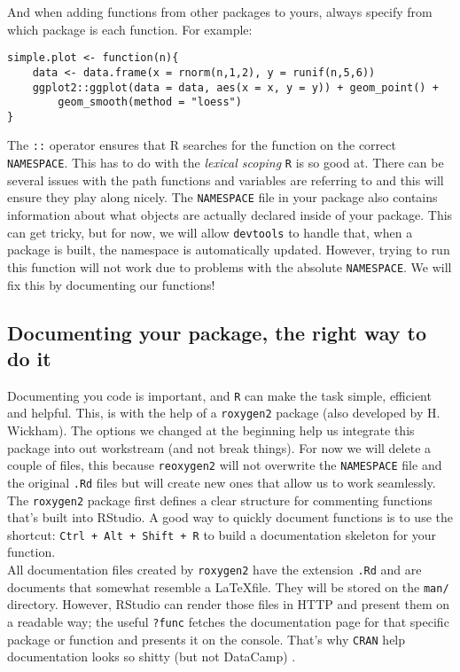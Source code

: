 \documentclass[pdftex,11pt,a4paper]{article}
\newcommand{\R}{\texttt{R} }
\begin{document}
And when adding functions from other packages to yours, always specify from which package is each function. For example:

\begin{verbatim}
simple.plot <- function(n){
	data <- data.frame(x = rnorm(n,1,2), y = runif(n,5,6))
	ggplot2::ggplot(data = data, aes(x = x, y = y)) + geom_point() +
		geom_smooth(method = "loess")
}
\end{verbatim}

The \verb|::| operator ensures that R searches for the function on the correct \verb|NAMESPACE|. This has to do with the \textit{lexical scoping} \R is so good at. There can be several issues with the path functions and variables are referring to and this will ensure they play along nicely. The \verb|NAMESPACE| file in your package also contains information about what objects are actually declared inside of your package. This can get tricky, but for now, we will allow \verb|devtools| to handle that, when a package is built, the namespace is automatically updated. However, trying to run this function will not work due to problems with the absolute \verb|NAMESPACE|. We will fix this by documenting our functions!

\subsection*{Documenting your package, the right way to do it}
Documenting you code is important, and \R can make the task simple, efficient and helpful. This, is with the help of a \verb|roxygen2| package (also developed by H. Wickham). The options we changed at the beginning help us integrate this package into out workstream (and not break things). For now we will delete a couple of files, this because \verb|reoxygen2| will not overwrite the \verb|NAMESPACE| file and the original \verb|.Rd| files but will create new ones that allow us to work seamlessly. The \verb|roxygen2| package first defines a clear structure for commenting functions that's built into RStudio. A good way to quickly document functions is to use the shortcut: \verb|Ctrl + Alt + Shift + R| to build a documentation skeleton for your function. \\

All documentation files created by \verb|roxygen2| have the extension \verb|.Rd| and are documents that somewhat resemble a \LaTeX file. They will be stored on the \verb|man/| directory. However, RStudio can render those files in HTTP and present them on a readable way; the useful \verb|?func| fetches the documentation page for that specific package or function and presents it on the console. That's why \verb|CRAN| help documentation looks so shitty (but not DataCamp) .\\
\end{document}
